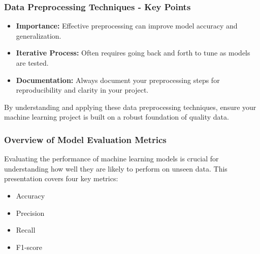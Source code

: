 \documentclass[aspectratio=169]{beamer}
\begin{document}
\begin{frame}[fragile]
    \frametitle{Data Preprocessing Techniques - Key Points}
    \begin{itemize}
        \item \textbf{Importance:} Effective preprocessing can improve model accuracy and generalization.
        \item \textbf{Iterative Process:} Often requires going back and forth to tune as models are tested.
        \item \textbf{Documentation:} Always document your preprocessing steps for reproducibility and clarity in your project.
    \end{itemize}
    By understanding and applying these data preprocessing techniques, ensure your machine learning project is built on a robust foundation of quality data.
\end{frame}

\begin{frame}[fragile]
    \frametitle{Overview of Model Evaluation Metrics}
    Evaluating the performance of machine learning models is crucial for understanding how well they are likely to perform on unseen data. This presentation covers four key metrics:
    \begin{itemize}
        \item Accuracy
        \item Precision
        \item Recall
        \item F1-score
    \end{itemize}
\end{frame}
\end{document}
